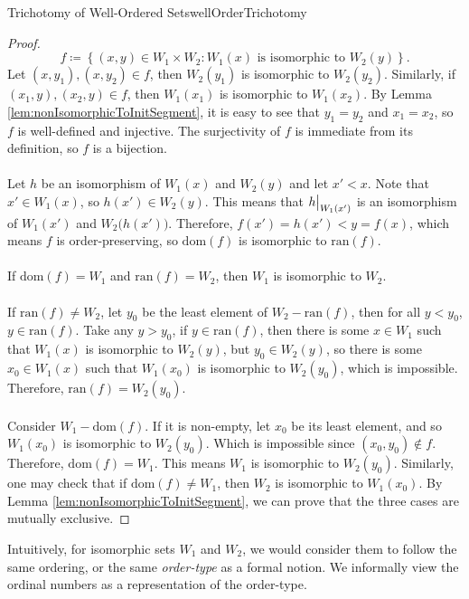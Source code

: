 \documentclass[math]{amznotes}
\theoremstyle{remark}
\begin{document}
\begin{thmbox}{Trichotomy of Well-Ordered Sets}{wellOrderTrichotomy}
\begin{proof}
\begin{equation*}
            f \coloneqq \left\{(x, y) \in W_1 \times W_2 \colon W_1(x) \textrm{ is isomorphic to } W_2(y)\right\}.
        \end{equation*}
        Let $(x, y_1), (x, y_2) \in f$, then $W_2(y_1)$ is isomorphic to $W_2(y_2)$. Similarly, if $(x_1, y), (x_2, y) \in f$, then $W_1(x_1)$ is isomorphic to $W_1(x_2)$. By Lemma \ref{lem:nonIsomorphicToInitSegment}, it is easy to see that $y_1 = y_2$ and $x_1 = x_2$, so $f$ is well-defined and injective. The surjectivity of $f$ is immediate from its definition, so $f$ is a bijection.
        \\\\
        Let $h$ be an isomorphism of $W_1(x)$ and $W_2(y)$ and let $x' < x$. Note that $x' \in W_1(x)$, so $h(x') \in W_2(y)$. This means that $\restrict{h}{W_1(x')}$ is an isomorphism of $W_1(x')$ and $W_2\bigl(h(x')\bigr)$. Therefore, $f(x') = h(x') < y = f(x)$, which means $f$ is order-preserving, so $\mathrm{dom}(f)$ is isomorphic to $\mathrm{ran}(f)$.
        \\\\
        If $\mathrm{dom}(f) = W_1$ and $\mathrm{ran}(f) = W_2$, then $W_1$ is isomorphic to $W_2$. 
        \\\\
        If $\mathrm{ran}(f) \neq W_2$, let $y_0$ be the least element of $W_2 - \mathrm{ran}(f)$, then for all $y < y_0$, $y \in \mathrm{ran}(f)$. Take any $y > y_0$, if $y \in \mathrm{ran}(f)$, then there is some $x \in W_1$ such that $W_1(x)$ is isomorphic to $W_2(y)$, but $y_0 \in W_2(y)$, so there is some $x_0 \in W_1(x)$ such that $W_1(x_0)$ is isomorphic to $W_2(y_0)$, which is impossible. Therefore, $\mathrm{ran}(f) = W_2(y_0)$. 
        \\\\
        Consider $W_1 - \mathrm{dom}(f)$. If it is non-empty, let $x_0$ be its least element, and so $W_1(x_0)$ is isomorphic to $W_2(y_0)$. Which is impossible since $(x_0, y_0) \notin f$. Therefore, $\mathrm{dom}(f) = W_1$. This means $W_1$ is isomorphic to $W_2(y_0)$. Similarly, one may check that if $\mathrm{dom}(f) \neq W_1$, then $W_2$ is isomorphic to $W_1(x_0)$. By Lemma \ref{lem:nonIsomorphicToInitSegment}, we can prove that the three cases are mutually exclusive.
    \end{proof}
\end{thmbox}
Intuitively, for isomorphic sets $W_1$ and $W_2$, we would consider them to follow the same ordering, or the same \textit{order-type} as a formal notion. We informally view the ordinal numbers as a representation of the order-type.
\end{document}
